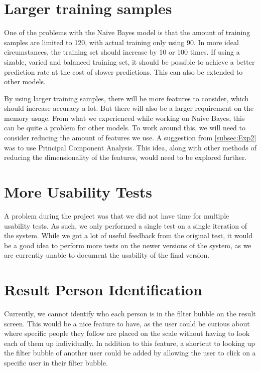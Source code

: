 \section*{Larger training samples}
One of the problems with the Naive Bayes model is that the amount of training
samples are limited to 120, with actual training only using 90. In more ideal
circumstances, the training set should increase by 10 or 100 times. If using a
sizable, varied and balanced training set, it should be possible to achieve a
better prediction rate at the cost of slower predictions. This can also be
extended to other models.\nl

By using larger training samples, there will be more features to consider, which
should increase accuracy a lot. But there will also be a larger requirement on
the memory usage. From what we experienced while working on Naive
Bayes, this can be quite a problem for other models. To work around
this, we will need to consider reducing the amount of features we use. A
suggestion from \autoref{subsec:Exp2} was to use Principal Component Analysis.
This idea, along with other methods of reducing the dimensionality of the
features, would need to be explored further.

\section*{More Usability Tests}
A problem during the project was that we did not have time for multiple
usability tests. As such, we only performed a single test on a single iteration
of the system. While we got a lot of useful feedback from the original test, it
would be a good idea to perform more tests on the newer versions of the system,
as we are currently unable to document the usability of the final version.

\section*{Result Person Identification}
Currently, we cannot identify who each person is in the filter bubble on the
result screen. This would be a nice feature to have, as the user could be
curious about where specific people they follow are placed on the scale without
having to look each of them up individually. In addition to this feature, a
shortcut to looking up the filter bubble of another user could be added by
allowing the user to click on a specific user in their filter bubble.




